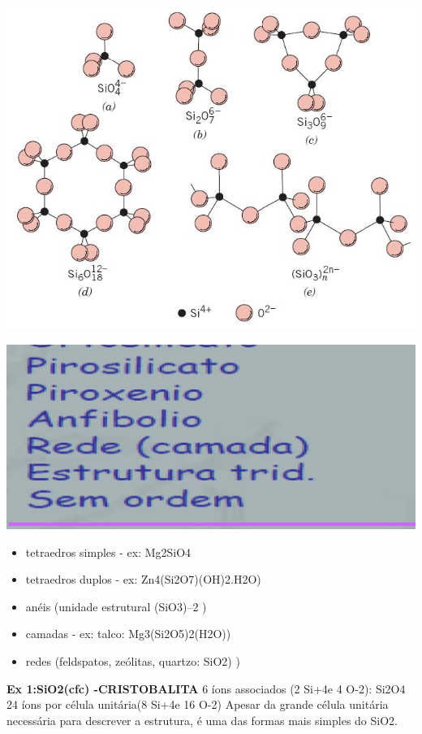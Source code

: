   \includegraphics[scale=0.5,trim={0 0 0 0}]{figures/estsil}
  
  
\includegraphics[scale=0.5,trim={0 0 0 0}]{figures/sil1}

\begin{itemize}
	\item tetraedros simples - ex: Mg2SiO4
	\item tetraedros duplos - ex: Zn4(Si2O7)(OH)2.H2O)
	\item anéis (unidade estrutural (SiO3)–2 )
	\item camadas - ex: talco: Mg3(Si2O5)2(H2O))
	\item redes (feldspatos, zeólitas, quartzo: SiO2) )
\end{itemize}

\textbf{Ex 1:SiO2(cfc) -CRISTOBALITA}
6 íons associados (2 Si+4e 4 O-2): Si2O4
24 íons por célula unitária(8 Si+4e 16 O-2)
Apesar da grande célula unitária necessária para descrever a estrutura, é uma das formas mais simples do SiO2.

